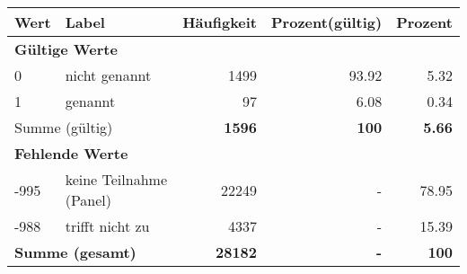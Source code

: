      \begin{longtable}{lXrrr}
     \toprule
     \textbf{Wert} & \textbf{Label} & \textbf{Häufigkeit} & \textbf{Prozent(gültig)} & \textbf{Prozent} \\
     \endhead
     \midrule
     \multicolumn{5}{l}{\textbf{Gültige Werte}}\\

     0 &
     \multicolumn{1}{X}{ nicht genannt   } &


       \num{1499} &
       \num[round-mode=places,round-precision=2]{93,92} &
         \num[round-mode=places,round-precision=2]{5,32} \\

     1 &
     \multicolumn{1}{X}{ genannt   } &


       \num{97} &
       \num[round-mode=places,round-precision=2]{6,08} &
         \num[round-mode=places,round-precision=2]{0,34} \\
     \midrule
     \multicolumn{2}{l}{Summe (gültig)} &
       \textbf{\num{1596}} &
     \textbf{100} &
       \textbf{\num[round-mode=places,round-precision=2]{5,66}} \\
     \multicolumn{5}{l}{\textbf{Fehlende Werte}}\\
       -995 &
       keine Teilnahme (Panel) &
         \num{22249} &
        - &
         \num[round-mode=places,round-precision=2]{78,95} \\
       -988 &
       trifft nicht zu &
         \num{4337} &
        - &
         \num[round-mode=places,round-precision=2]{15,39} \\
     \midrule
     \multicolumn{2}{l}{\textbf{Summe (gesamt)}} &
          \textbf{\num{28182}} &
        \textbf{-} &
        \textbf{100} \\
     \bottomrule
     \end{longtable}
     
